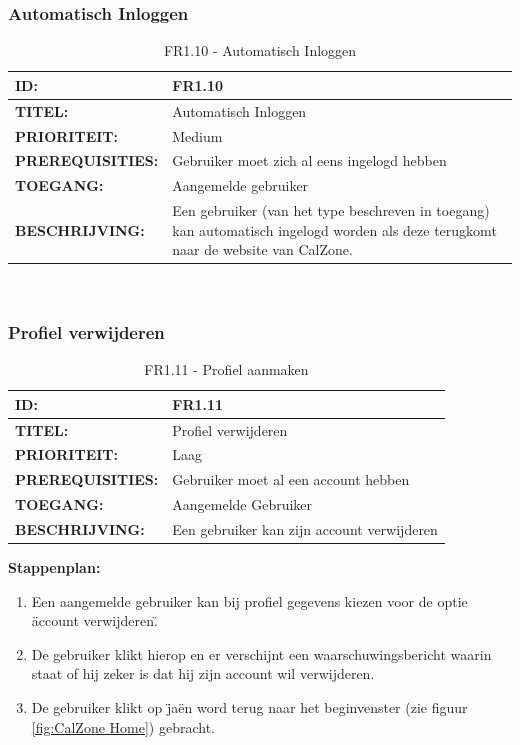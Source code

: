\subsubsection{Automatisch Inloggen}  
\noindent\begin{table}[H]
            \begin{tabular}{l | p{10cm}}
                \textbf{ID:} & FR1.10 \\ \hline
                \textbf{TITEL:} & Automatisch Inloggen\\ \hline
                \textbf{PRIORITEIT:} &  Medium \\ \hline
                \textbf{PREREQUISITIES:} & Gebruiker moet zich al eens ingelogd hebben \\ \hline
                \textbf{TOEGANG:} & Aangemelde gebruiker \\ \hline
                \textbf{BESCHRIJVING:} & Een gebruiker (van het type beschreven in toegang) kan automatisch ingelogd worden als deze terugkomt naar de website van CalZone. 
            \end{tabular}\\
            \caption{FR1.10 - Automatisch Inloggen}
            \label{tab:FR1.10 - Automatisch Inloggen}
        \end{table}
        
\subsubsection{Profiel verwijderen}
	\begin{table}[H]
	\caption{FR1.11 - Profiel aanmaken}
    		\begin{tabular}{l | p{10cm}}
        \textbf{ID:} & FR1.11 \\ \hline
        \textbf{TITEL:} & Profiel verwijderen \\ \hline
        \textbf{PRIORITEIT:} &  Laag \\ \hline
        \textbf{PREREQUISITIES:} & Gebruiker moet al een account hebben\\ \hline
        \textbf{TOEGANG:} &  Aangemelde Gebruiker \\ \hline
        \textbf{BESCHRIJVING:} & Een gebruiker kan zijn account verwijderen\\
    \end{tabular} 
	\label{tab:FR1.11 -Profiel aanmaken}
\end{table}

\textbf{Stappenplan:}
\begin{enumerate}
\item Een aangemelde gebruiker kan bij profiel gegevens kiezen voor de optie \"account verwijderen\".
\item De gebruiker klikt hierop en er verschijnt een waarschuwingsbericht waarin staat of hij zeker is dat hij zijn account wil verwijderen.
\item De gebruiker klikt op \"ja\" en word terug naar het beginvenster (zie figuur \ref{fig:CalZone Home}) gebracht.
\end{enumerate}

